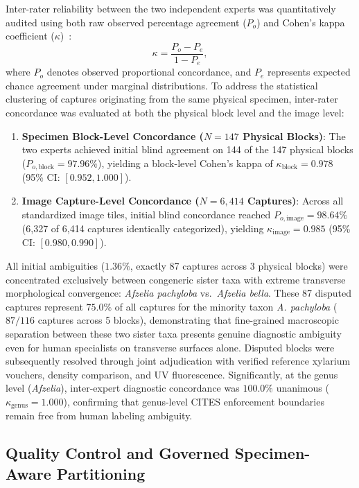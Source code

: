 \documentclass[a4paper,fleqn,12pt]{cas-sc}
\begin{document}
Inter-rater reliability between the two independent experts was quantitatively audited using both raw observed percentage agreement ($P_o$) and Cohen's kappa coefficient ($\kappa$)~\cite{cohen1960}:
\begin{equation}
\kappa = \frac{P_o - P_e}{1 - P_e},
\end{equation}
where $P_o$ denotes observed proportional concordance, and $P_e$ represents expected chance agreement under marginal distributions. To address the statistical clustering of captures originating from the same physical specimen, inter-rater concordance was evaluated at both the physical block level and the image level:
\begin{enumerate}[leftmargin=*,itemsep=1.5pt,topsep=2pt]
    \item \textbf{Specimen Block-Level Concordance ($N=147$ Physical Blocks)}: The two experts achieved initial blind agreement on 144 of the 147 physical blocks ($P_{o,\text{block}} = 97.96\%$), yielding a block-level Cohen's kappa of $\kappa_{\text{block}} = 0.978$ (95\% CI: $[0.952, 1.000]$).
    \item \textbf{Image Capture-Level Concordance ($N=6{,}414$ Captures)}: Across all standardized image tiles, initial blind concordance reached $P_{o,\text{image}} = 98.64\%$ (6,327 of 6,414 captures identically categorized), yielding $\kappa_{\text{image}} = 0.985$ (95\% CI: $[0.980, 0.990]$).
\end{enumerate}
All initial ambiguities ($1.36\%$, exactly 87 captures across 3 physical blocks) were concentrated exclusively between congeneric sister taxa with extreme transverse morphological convergence: \textit{Afzelia pachyloba} vs.\ \textit{Afzelia bella}. These 87 disputed captures represent $75.0\%$ of all captures for the minority taxon \textit{A. pachyloba} ($87 / 116$ captures across 5 blocks), demonstrating that fine-grained macroscopic separation between these two sister taxa presents genuine diagnostic ambiguity even for human specialists on transverse surfaces alone. Disputed blocks were subsequently resolved through joint adjudication with verified reference xylarium vouchers, density comparison, and UV fluorescence. Significantly, at the genus level (\textit{Afzelia}), inter-expert diagnostic concordance was $100.0\%$ unanimous ($\kappa_{\text{genus}} = 1.000$), confirming that genus-level CITES enforcement boundaries remain free from human labeling ambiguity.

\subsection{Quality Control and Governed Specimen-Aware Partitioning}
\label{sec:quality_control}
\end{document}

